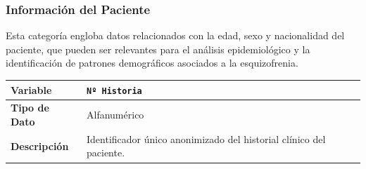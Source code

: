\documentclass[12pt,a4paper,onecolumn,oneside]{report}
\begin{document}

\subsubsection{Información del Paciente}
Esta categoría engloba datos relacionados con la edad, sexo y nacionalidad del paciente, que pueden ser relevantes para el análisis epidemiológico y la identificación de patrones demográficos asociados a la esquizofrenia.

\vspace{0.3cm}
\noindent
\begin{tabular}{|p{3.5cm}|p{10.5cm}|}
\hline
\rowcolor[RGB]{239,239,239} 
\textbf{Variable} & \textbf{\texttt{Nº Historia}} \\ \hline
\textbf{Tipo de Dato} & Alfanumérico \\ \hline
\textbf{Descripción} & Identificador único anonimizado del historial clínico del paciente. \\ \hline
\end{tabular}
\label{tab:var_n_historia}
\vspace{0.4cm}
\end{document}

